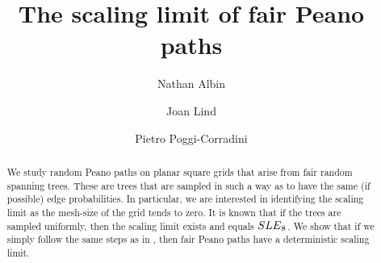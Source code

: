 \documentclass[preprint,12pt]{elsarticle}
\theoremstyle{definition}
\theoremstyle{remark}
\numberwithin{equation}{section}
\begin{document}
\begin{frontmatter}


 \title{The scaling limit of fair Peano paths}



\author[label1]{Nathan Albin}
\author[label2]{Joan Lind}
\author[label1]{Pietro Poggi-Corradini}




\begin{abstract}
We study random Peano paths on planar square grids that arise from fair random spanning trees. These are trees that are sampled in such a way as to have the same (if possible) edge probabilities.
In particular, we are interested in identifying the scaling limit as the mesh-size of the grid tends to zero. 
It is known \cite{lawler-schramm-werner2002} 
that if the trees are sampled uniformly, then the scaling limit exists and equals ${\rm SLE}_8$. We show that if we simply follow the same steps as in 
\cite{lawler-schramm-werner2002}, 
then fair Peano paths have a deterministic scaling limit.
\end{abstract}




\end{frontmatter}
\end{document}
